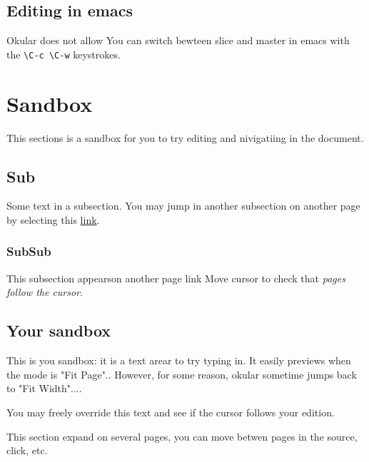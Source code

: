 \documentclass{article}
\begin{document}
\subsection{Editing in emacs}

Okular does not allow
You can switch bewteen slice and master in emacs with the 
\verb"\C-c \C-w" keystrokes. 


\section {Sandbox}

This sections is a sandbox for you to try editing and nivigatiing in the
document. 
 
\subsection {Sub}

Some text in a subsection.
You may jump in another subsection on another page by selecting this
\hyperlink{next}{link}.

\newpage

\subsubsection {SubSub} 

This subsection appearson another page \hypertarget{next}{link} 
Move cursor to check that \emph{pages follow the cursor}.

\subsection {Your sandbox}

 \hbox \bgroup

\begin{minipage}{0.8\linewidth}
This is you sandbox: it is a text arear to try typing in. It easily previews
when the mode is "Fit Page".. However, for some reason, okular sometime
jumps back to "Fit Width"....

\medskip

You may freely override this text and see if the cursor follows your
edition. 
\end{minipage}

\egroup
\centerline{}

\newpage
This section expand on several pages, you can move betwen pages in the
source, click, etc.
\end{document}
